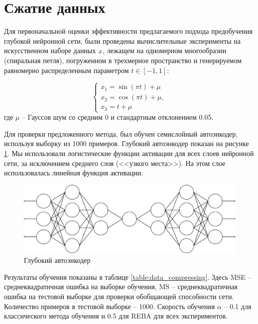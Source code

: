 \section{Сжатие данных}

Для первоначальной оценки эффективности предлагаемого подхода предобучения глубокой нейронной сети, были проведены вычислительные эксперименты на искусственном наборе данных $\boldmath{x}$, лежащем на одномерном многообразии (спиральная петля), погруженном в трехмерное пространство \cite{n11} и генерируемом равномерно распределенным параметром $t \in [-1, 1]$:

\begin{equation*}
	\begin{cases}
		x_1=\sin(\pi t) + \mu\\
		x_2=\cos(\pi t) + \mu,\\
		x_3=t + \mu
	\end{cases}
\end{equation*}
где $\mu$ -- Гауссов шум со средним 0 и стандартным отклонением 0.05.

Для проверки предложенного метода, был обучен семислойный автоэнкодер, используя выборку из 1000 примеров. Глубокий автоэнкодер показан на рисунке \ref{fig:autoencoder}. Мы использовали логистические функции активации для всех слоев нейронной сети, за исключением среднего слоя (<<узкого места>>). На этом слое использовалась линейная функция активации.

\begin{figure}[ht]
	\centering
	\includegraphics[width=16cm]{man-source/images/ch3/pic3-5.pdf}
	\caption{Глубокий автоэнкодер}
	\label{fig:autoencoder}
\end{figure}

Результаты обучения показаны в таблице \ref{table:data_compressing}. Здесь MSE -- среднеквадратичная ошибка на выборке обучения, MS -- среднеквадратичная ошибка на тестовой выборке для проверки обобщающей способности сети. Количество примеров в тестовой выборке -- 1000. Скорость обучения $\alpha$ -- 0.1 для классического метода обучения и 0.5 для REBA для всех экспериментов.

